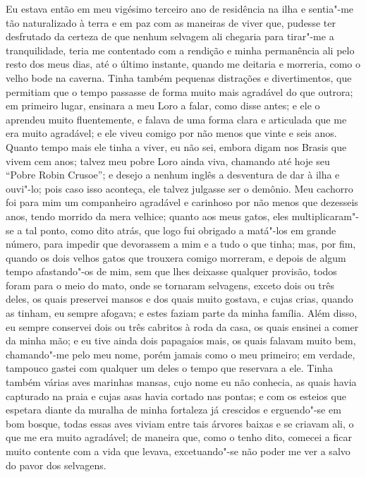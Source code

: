 Eu estava então em meu vigésimo terceiro ano de residência na ilha e
sentia"-me tão naturalizado à terra e em paz com as maneiras de viver
que, pudesse ter desfrutado da certeza de que nenhum selvagem ali
chegaria para tirar"-me a tranquilidade, teria me contentado com a
rendição e minha permanência ali pelo resto dos meus dias, até o último
instante, quando me deitaria e morreria, como o velho bode na caverna.
Tinha também pequenas distrações e divertimentos, que permitiam que o
tempo passasse de forma muito mais agradável do que outrora; em primeiro
lugar, ensinara a meu Loro a falar, como disse antes; e ele o aprendeu
muito fluentemente, e falava de uma forma clara e articulada que me era
muito agradável; e ele viveu comigo por não menos que vinte e seis anos.
Quanto tempo mais ele tinha a viver, eu não sei, embora digam nos Brasis
que vivem cem anos; talvez meu pobre Loro ainda viva, chamando até hoje
seu ``Pobre Robin Crusoe''; e desejo a nenhum inglês a desventura de dar
à ilha e ouvi"-lo; pois caso isso aconteça, ele talvez julgasse ser o
demônio. Meu cachorro foi para mim um companheiro agradável e carinhoso
por não menos que dezesseis anos, tendo morrido da mera velhice; quanto
aos meus gatos, eles multiplicaram"-se a tal ponto, como dito atrás, que
logo fui obrigado a matá"-los em grande número, para impedir que
devorassem a mim e a tudo o que tinha; mas, por fim, quando os dois
velhos gatos que trouxera comigo morreram, e depois de algum tempo
afastando"-os de mim, sem que lhes deixasse qualquer provisão, todos
foram para o meio do mato, onde se tornaram selvagens, exceto dois ou
três deles, os quais preservei mansos e dos quais muito gostava, e cujas
crias, quando as tinham, eu sempre afogava; e estes faziam parte da
minha família. Além disso, eu sempre conservei dois ou três cabritos à
roda da casa, os quais ensinei a comer da minha mão; e eu tive ainda
dois papagaios mais, os quais falavam muito bem, chamando"-me pelo meu
nome, porém jamais como o meu primeiro; em verdade, tampouco gastei com
qualquer um deles o tempo que reservara a ele. Tinha também várias aves
marinhas mansas, cujo nome eu não conhecia, as quais havia capturado na
praia e cujas asas havia cortado nas pontas; e com os esteios que
espetara diante da muralha de minha fortaleza já crescidos e erguendo"-se
em bom bosque, todas essas aves viviam entre tais árvores baixas e se
criavam ali, o que me era muito agradável; de maneira que, como o tenho
dito, comecei a ficar muito contente com a vida que levava,
excetuando"-se não poder me ver a salvo do pavor dos selvagens.

